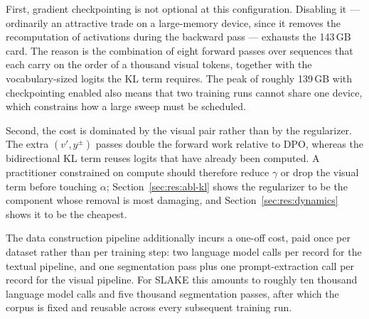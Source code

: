 First, gradient checkpointing is not optional at this configuration. Disabling it --- ordinarily an attractive trade on a large-memory device, since it removes the recomputation of activations during the backward pass --- exhausts the 143\,GB card. The reason is the combination of eight forward passes over sequences that each carry on the order of a thousand visual tokens, together with the vocabulary-sized logits the KL term requires. The peak of roughly 139\,GB with checkpointing enabled also means that two training runs cannot share one device, which constrains how a large sweep must be scheduled.

Second, the cost is dominated by the visual pair rather than by the regularizer. The extra $(v', y^{\pm})$ passes double the forward work relative to DPO, whereas the bidirectional KL term reuses logits that have already been computed. A practitioner constrained on compute should therefore reduce $\gamma$ or drop the visual term before touching $\alpha$; Section~\ref{sec:res:abl-kl} shows the regularizer to be the component whose removal is most damaging, and Section~\ref{sec:res:dynamics} shows it to be the cheapest.

The data construction pipeline additionally incurs a one-off cost, paid once per dataset rather than per training step: two language model calls per record for the textual pipeline, and one segmentation pass plus one prompt-extraction call per record for the visual pipeline. For SLAKE this amounts to roughly ten thousand language model calls and five thousand segmentation passes, after which the corpus is fixed and reusable across every subsequent training run.
